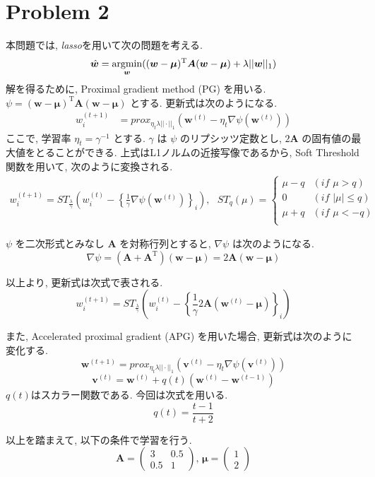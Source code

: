 \documentclass[a4paper,10pt]{jsarticle}
\newcommand{\argmin}{\mathop{\rm argmin}\limits}
\begin{document}
\section*{Problem 2}
本問題では, \textit{lasso}を用いて次の問題を考える.
\[
 \hat{\bm{w}} = \argmin_{\bm{w}}((\bm{w}-\bm{\mu})^\mathrm{T}\bm{A}(\bm{w}-\bm{\mu})
 + \lambda||\bm{w}||_1)
\]
解を得るために, Proximal gradient method (PG) を用いる.
$\psi = (\bm{w}-\bm{\mu})^\mathrm{T}\bm{A}(\bm{w}-\bm{\mu})$ とする.
更新式は次のようになる.
\begin{align*}
 w^{(t+1)}_i
 &= prox_{\eta_t\lambda||\cdot||_1}\left(\bm{w}^{(t)}
 - \eta_t\nabla\psi(\bm{w}^{(t)})\right)
\end{align*}
ここで, 学習率 $\eta_t=\gamma^{-1}$ とする.
$\gamma$ は $\psi$ のリプシッツ定数とし, $2\bm{A}$ の固有値の最大値をとることができる.
上式はL1ノルムの近接写像であるから, Soft Threshold関数を用いて, 次のように変換される.
\begin{align*}
 w^{(t+1)}_i
 = ST_{\frac{\lambda}{\gamma}}\left(w^{(t)}_i
 -\left\{\frac{1}{\gamma}\nabla\psi(\bm{w}^{(t)})\right\}_i\right),
 \,\,\,\,
 ST_q(\mu) = \begin{cases}
              \mu - q &(\mathit{if} \,\, \mu > q)\\
              0 &(\mathit{if} \,\, |\mu| \leq q)\\
              \mu + q &(\mathit{if} \,\, \mu < -q)\\
             \end{cases}
\end{align*}

$\psi$ を二次形式とみなし $\bm{A}$ を対称行列とすると, $\nabla \psi$ は次のようになる.
\[
 \nabla \psi = (\bm{A} + \bm{A}^\mathrm{T})(\bm{w} - \bm{\mu}) = 2\bm{A}(\bm{w} - \bm{\mu})
\]

以上より, 更新式は次式で表される.
\[
 w^{(t+1)}_i
 = ST_{\frac{\lambda}{\gamma}}\left(w^{(t)}_i
 -\left\{\frac{1}{\gamma}2\bm{A}(\bm{w}^{(t)} - \bm{\mu})\right\}_i\right)
\]

また, Accelerated proximal gradient (APG) を用いた場合, 更新式は次のように変化する.
\[
  \bm{w}^{(t+1)} = prox_{\eta_t\lambda||\cdot||_1}\left(
 \bm{v}^{(t)} - \eta_t\nabla\psi(\bm{v}^{(t)})\right)
\]
\[ \bm{v}^{(t)} = \bm{w}^{(t)} + q(t)(\bm{w}^{(t)} - \bm{w}^{(t-1)}) \]
$q(t)$はスカラー関数である. 今回は次式を用いる.
\[ q(t) = \frac{t-1}{t+2} \]

以上を踏まえて, 以下の条件で学習を行う.
\[
 \bm{A} = \left(\begin{array}{cc} 3 & 0.5 \\ 0.5 & 1 \end{array}\right), \,
 \bm{\mu} = \left(\begin{array}{c} 1 \\ 2 \end{array}\right)
\]
\end{document}
